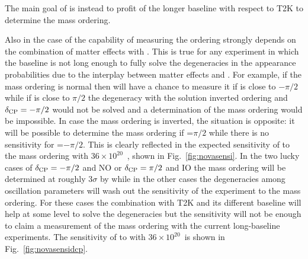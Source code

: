The main goal of \nova is instead to profit of the longer baseline with respect to T2K to determine the mass ordering. 

%
%
Also in the case of \nova the capability of measuring the ordering strongly depends on the combination of matter effects with \dcp. This is true for any experiment in which the baseline is not long enough to fully solve the degeneracies in the appearance probabilities due to the interplay between matter effects and \dcp. 
For example, if the mass ordering is normal then \nova will have a chance to measure it if \dcp is close to $-\pi/2$ while if \dcp is close to $\pi/2$ the degeneracy with the solution inverted ordering and $\delta_{\mathrm{CP}}=-\pi/2$ would not be solved and a determination of the mass ordering would be impossible. In case the mass ordering is inverted, the situation is opposite: it will be possible to determine the mass ordering if \dcp=$\pi/2$ while there is no sensitivity for \dcp=$-\pi/2$. This is clearly reflected in the expected sensitivity of \nova to the mass ordering with $36\times10^{20}$~\pot, shown in Fig.~\ref{fig:novasensi}.
In the two lucky cases of $\delta_{\mathrm{CP}}=-\pi/2$ and NO or $\delta_{\mathrm{CP}}=\pi/2$ and IO the mass ordering will be determined at roughly $3\sigma$ by \nova while in the other cases the degeneracies among oscillation parameters will wash out the sensitivity of the experiment to the mass ordering. For these cases the combination with T2K and its different baseline will help at some level to solve the degeneracies but the sensitivity will not be enough to claim a measurement of the mass ordering with the current long-baseline experiments. The sensitivity of \nova to \dcp with  $36\times10^{20}$~\pot is shown in Fig.~\ref{fig:novasensidcp}.


